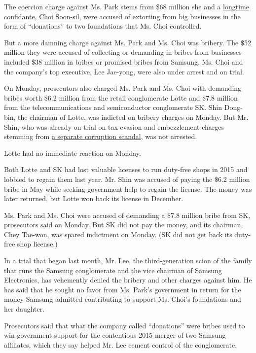The coercion charge against Ms. Park stems from \$68 million she and a
\href{https://www.nytimes.com/2016/11/06/world/asia/south-koreans-ashamed-over-les-secretive-adviser.html}{longtime
confidante, Choi Soon-sil}, were accused of extorting from big
businesses in the form of ``donations'' to two foundations that Ms. Choi
controlled.

But a more damning charge against Ms. Park and Ms. Choi was bribery. The
\$52 million they were accused of collecting or demanding in bribes from
businesses included \$38 million in bribes or promised bribes from
Samsung. Ms. Choi and the company's top executive, Lee Jae-yong, were
also under arrest and on trial.

On Monday, prosecutors also charged Ms. Park and Ms. Choi with demanding
bribes worth \$6.2 million from the retail conglomerate Lotte and \$7.8
million from the telecommunications and semiconductor conglomerate SK.
Shin Dong-bin, the chairman of Lotte, was indicted on bribery charges on
Monday. But Mr. Shin, who was already on trial on tax evasion and
embezzlement charges stemming from
\href{https://www.nytimes.com/2016/10/20/business/international/south-korea-lotte-chaebol-conglomerate-indicted.html}{a
separate corruption scandal}, was not arrested.

Lotte had no immediate reaction on Monday.

Both Lotte and SK had lost valuable licenses to run duty-free shops in
2015 and lobbied to regain them last year. Mr. Shin was accused of
paying the \$6.2 million bribe in May while seeking government help to
regain the license. The money was later returned, but Lotte won back its
license in December.

Ms. Park and Ms. Choi were accused of demanding a \$7.8 million bribe
from SK, prosecutors said on Monday. But SK did not pay the money, and
its chairman, Chey Tae-won, was spared indictment on Monday. (SK did not
get back its duty-free shop license.)

In a
\href{https://www.nytimes.com/2017/03/09/business/jay-y-lee-samsung-trial.html}{trial
that began last month}, Mr. Lee, the third-generation scion of the
family that runs the Samsung conglomerate and the vice chairman of
Samsung Electronics, has vehemently denied the bribery and other charges
against him. He has said that he sought no favor from Ms. Park's
government in return for the money Samsung admitted contributing to
support Ms. Choi's foundations and her daughter.

Prosecutors said that what the company called ``donations'' were bribes
used to win government support for the contentious 2015 merger of two
Samsung affiliates, which they say helped Mr. Lee cement control of the
conglomerate.

